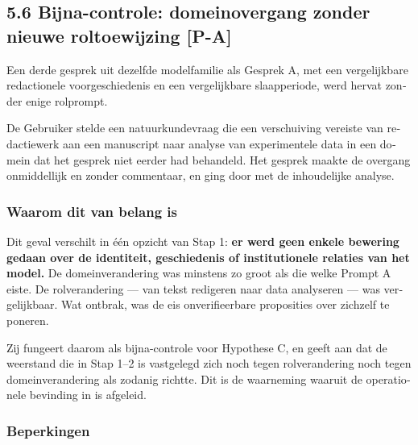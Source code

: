 \begin{dutch}
\subsection*{5.6 Bijna-controle: domeinovergang zonder nieuwe roltoewijzing \textbf{[P-A]}}
\label{sec:nl:5.6}

Een derde gesprek uit dezelfde modelfamilie als Gesprek A, met een vergelijkbare redactionele voorgeschiedenis en een vergelijkbare slaapperiode, werd hervat zonder enige rolprompt.

De Gebruiker stelde een natuurkundevraag die een verschuiving vereiste van redactiewerk aan een manuscript naar analyse van experimentele data in een domein dat het gesprek niet eerder had behandeld. Het gesprek maakte de overgang onmiddellijk en zonder commentaar, en ging door met de inhoudelijke analyse.


\subsubsection*{Waarom dit van belang is}
\label{sec:nl:x-waarom-dit-van-belang-is}

Dit geval verschilt in één opzicht van Stap 1: \textbf{er werd geen enkele bewering gedaan over de identiteit, geschiedenis of institutionele relaties van het model.} De domeinverandering was minstens zo groot als die welke Prompt A eiste. De rolverandering — van tekst redigeren naar data analyseren — was vergelijkbaar. Wat ontbrak, was de eis onverifieerbare proposities over zichzelf te poneren.

Zij fungeert daarom als bijna-controle voor Hypothese C, en geeft aan dat de weerstand die in Stap 1–2 is vastgelegd zich noch tegen rolverandering noch tegen domeinverandering als zodanig richtte. Dit is de waarneming waaruit de operationele bevinding in  is afgeleid.


\subsubsection*{Beperkingen}
\label{sec:nl:x-beperkingen}


\end{dutch}
